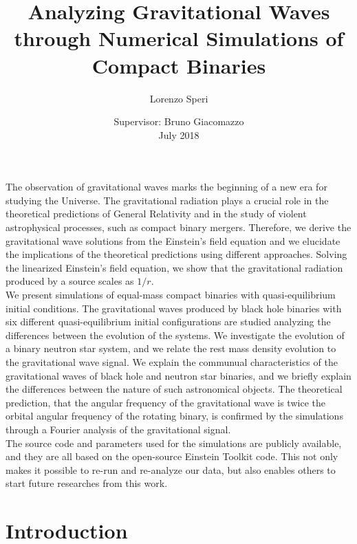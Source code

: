 \documentclass[twoside,english, a4paper, 12pt]{shared/uiofysmaster}
\author{Lorenzo Speri}
\title{\bf{Analyzing Gravitational Waves through Numerical Simulations of Compact Binaries}}
\date{Supervisor:
Bruno Giacomazzo\\
July 2018}
\begin{document}

\maketitle
\clearpage
\thispagestyle{empty}
\tableofcontents
\pagebreak



\begin{abstract1}
The observation of gravitational waves marks the beginning of a new era for studying the Universe.
The gravitational radiation plays a crucial role in the theoretical predictions of General Relativity and in the study of violent astrophysical processes, such as compact binary mergers. 
Therefore, we derive the gravitational wave solutions from the Einstein's field equation and we elucidate the implications of the theoretical predictions using different approaches.
Solving the linearized Einstein's field equation, we show that the gravitational radiation produced by a source scales as $1/r$. \\
We present simulations of equal-mass compact binaries with quasi-equilibrium initial conditions.
The gravitational waves produced by black hole binaries with six different quasi-equilibrium initial configurations are studied analyzing the differences between the evolution of the systems.
We investigate the evolution of a binary neutron star system, and we relate the rest mass density evolution to the gravitational wave signal.
We explain the communual characteristics of the gravitational waves of black hole and neutron star binaries, and we briefly explain the differences between the nature of such astronomical objects.
The theoretical prediction, that the angular frequency of the gravitational wave is twice the orbital angular frequency of the rotating binary, is confirmed by the simulations through a Fourier analysis of the gravitational signal.\\
The source code and parameters used for the simulations are publicly available, and they are all based on the open-source Einstein Toolkit code.  
This not only makes it possible to re-run and re-analyze our data, but also enables others to start future researches from this work.
\end{abstract1}
\setcounter{page}{1}


\clearpage
\section{Introduction}

\end{document}
